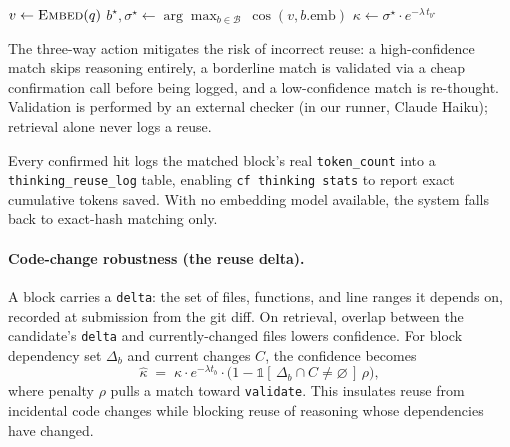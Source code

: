\documentclass[10pt]{article}
\begin{document}
\begin{algorithm}[t]
\footnotesize
\DontPrintSemicolon
\caption{Thinking-block retrieval cascade}
\label{alg:retrieval}
$v \leftarrow \textsc{Embed}(q)$ 
$b^\star,\sigma^\star \leftarrow \arg\max_{b\in\mathcal{B}}\ \cos(v, b.\text{emb})$\;
$\kappa \leftarrow \sigma^\star \cdot e^{-\lambda\, t_{b^\star}}$ 
\end{algorithm}

The three-way action mitigates the risk of incorrect reuse: a high-confidence
match skips reasoning entirely, a borderline match is validated via a cheap
confirmation call before being logged, and a low-confidence match is re-thought.
Validation is performed by an external checker (in our runner, Claude Haiku);
retrieval alone never logs a reuse.

Every confirmed hit logs the matched block's real \texttt{token\_count} into a
\texttt{thinking\_reuse\_log} table, enabling \texttt{cf thinking stats} to
report exact cumulative tokens saved. With no embedding model available, the
system falls back to exact-hash matching only.

\paragraph{Code-change robustness (the reuse delta).}
A block carries a \texttt{delta}: the set of files, functions, and line ranges
it depends on, recorded at submission from the git diff. On retrieval, overlap
between the candidate's \texttt{delta} and currently-changed files lowers
confidence. For block dependency set $\Delta_b$ and current changes $C$, the
confidence becomes
\begin{equation}
\label{eq:delta}
\hat\kappa \;=\; \kappa \cdot e^{-\lambda t_b}\cdot
\bigl(1 - \mathbb{1}[\,\Delta_b \cap C \neq \varnothing\,]\,\rho\bigr),
\end{equation}
where penalty $\rho$ pulls a match toward \texttt{validate}. This insulates reuse
from incidental code changes while blocking reuse of reasoning whose dependencies
have changed.
\end{document}

